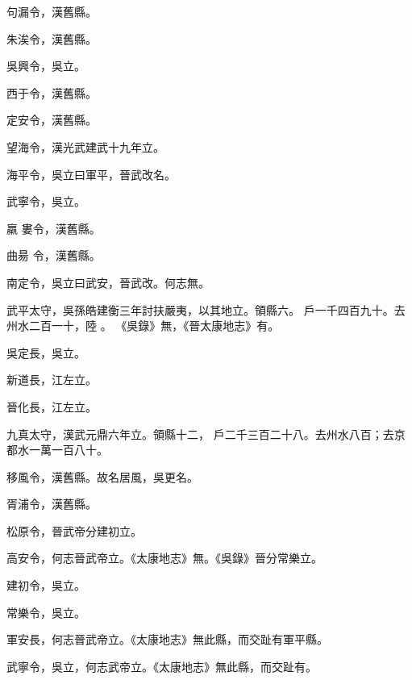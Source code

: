 \begin{pinyinscope}
 句漏令，漢舊縣。



 朱涘令，漢舊縣。



 吳興令，吳立。



 西于令，漢舊縣。



 定安令，漢舊縣。



 望海令，漢光武建武十九年立。



 海平令，吳立曰軍平，晉武改名。



 武寧令，吳立。


羸
 婁令，漢舊縣。


曲昜
 令，漢舊縣。



 南定令，吳立曰武安，晉武改。何志無。


武平太守，吳孫皓建衡三年討扶嚴夷，以其地立。領縣六。
 戶一千四百九十。去州水二百一十，陸
 。
 《吳錄》無，《晉太康地志》有。



 吳定長，吳立。



 新道長，江左立。



 晉化長，江左立。


九真太守，漢武元鼎六年立。領縣十二，
 戶二千三百二十八。去州水八百；去京都水一萬一百八十。



 移風令，漢舊縣。故名居風，吳更名。



 胥浦令，漢舊縣。



 松原令，晉武帝分建初立。



 高安令，何志晉武帝立。《太康地志》無。《吳錄》晉分常樂立。



 建初令，吳立。



 常樂令，吳立。



 軍安長，何志晉武帝立。《太康地志》無此縣，而交趾有軍平縣。



 武寧令，吳立，何志武帝立。《太康地志》無此縣，而交趾有。



\end{pinyinscope}
